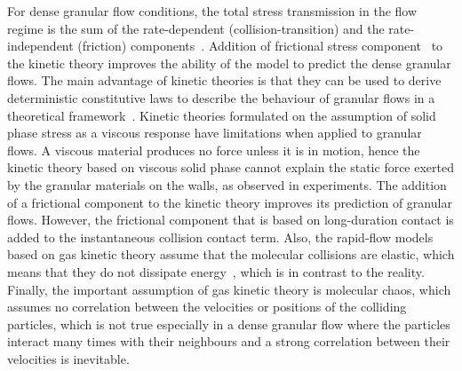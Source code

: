 For dense granular flow conditions, the total stress transmission in the flow 
regime is the sum of the rate-dependent (collision-transition) and the 
rate-independent (friction) components~\citep{Ng2008}. Addition of frictional 
stress component~\citep{Schaeffer1987} to the kinetic theory improves the 
ability of the model to predict the dense granular flows. The main advantage of 
kinetic theories is that they can be used to derive deterministic constitutive 
laws to describe the behaviour of granular flows in a theoretical 
framework~\citep{Jenkins1983}. Kinetic theories formulated on the assumption of 
solid phase stress as a viscous response have limitations when applied to 
granular flows. A viscous material produces no force unless it is in motion, 
hence the kinetic theory based on viscous solid phase cannot explain the static 
force exerted by the granular materials on the walls, as observed in 
experiments. The addition of a frictional component to the kinetic theory 
improves its prediction of granular flows. However, the frictional component 
that is based on long-duration contact is added to the instantaneous collision 
contact term. Also, the rapid-flow models based on gas kinetic theory assume 
that the molecular collisions are elastic, which means that they do not 
dissipate energy~\citep{Campbell2006}, which is in contrast to the reality. 
Finally, the important assumption of gas kinetic theory is molecular chaos, 
which assumes no correlation between the velocities or positions of the 
colliding particles, which is not true especially in a dense granular flow 
where the particles interact many times with their neighbours and a strong 
correlation between their velocities is inevitable.

